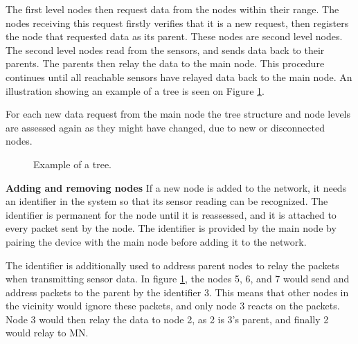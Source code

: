 The first level nodes then request data from the nodes within their range. 
The nodes receiving this request firstly verifies that it is a new request, then registers the node that requested data as its parent. 
These nodes are second level nodes. The second level nodes read from the sensors, and sends data back to their parents. The parents then relay the data to the main node. 
This procedure continues until all reachable sensors have relayed data back to the main node.
An illustration showing an example of a tree is seen on Figure \ref{fig:prottree1}.

For each new data request from the main node the tree structure and node levels are assessed again as they might have changed, due to new or disconnected nodes.

\begin{figure}[!h]
	\centering
	\caption{Example of a tree.}
	\label{fig:prottree1}
\end{figure}

\textbf{Adding and removing nodes}\newline
If a new node is added to the network, it needs an identifier in the system so that its sensor reading can be recognized. The identifier is permanent for the node until it is reassessed, and it is attached to every packet sent by the node.
The identifier is provided by the main node by pairing the device with the main node before adding it to the network. 

The identifier is additionally used to address parent nodes to relay the packets when transmitting sensor data. In figure \ref{fig:prottree1}, the nodes 5, 6, and 7 would send and address packets to the parent by the identifier 3. This means that other nodes in the vicinity would ignore these packets, and only node 3 reacts on the packets. Node 3 would then relay the data to node 2, as 2 is 3's parent, and finally 2 would relay to MN.

